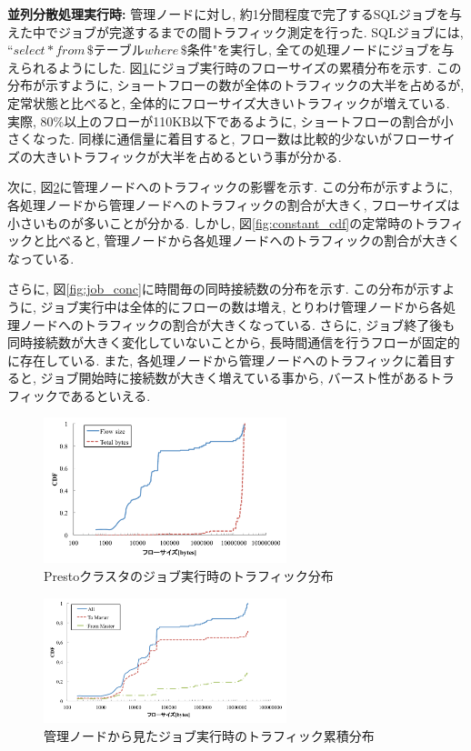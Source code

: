 {\bf 並列分散処理実行時: }
管理ノードに対し, 約1分間程度で完了するSQLジョブを与えた中でジョブが完遂するまでの間トラフィック測定を行った.
SQLジョブには, ``$select * from \, \$テーブル where \, \$条件$"を実行し,
全ての処理ノードにジョブを与えられるようにした.
図\ref{fig:job}にジョブ実行時のフローサイズの累積分布を示す.
この分布が示すように, ショートフローの数が全体のトラフィックの大半を占めるが, 定常状態と比べると,
全体的にフローサイズ大きいトラフィックが増えている.
実際, 80\%以上のフローが110KB以下であるように, ショートフローの割合が小さくなった.
同様に通信量に着目すると, フロー数は比較的少ないがフローサイズの大きいトラフィックが大半を占めるという事が分かる.

次に, 図\ref{fig:job_cdf}に管理ノードへのトラフィックの影響を示す.
この分布が示すように, 各処理ノードから管理ノードへのトラフィックの割合が大きく, フローサイズは小さいものが多いことが分かる.
しかし, 図\ref{fig:constant_cdf}の定常時のトラフィックと比べると,
管理ノードから各処理ノードへのトラフィックの割合が大きくなっている.

さらに, 図\ref{fig:job_conc}に時間毎の同時接続数の分布を示す.
この分布が示すように, ジョブ実行中は全体的にフローの数は増え, とりわけ管理ノードから各処理ノードへのトラフィックの割合が大きくなっている.
さらに, ジョブ終了後も同時接続数が大きく変化していないことから, 長時間通信を行うフローが固定的に存在している.
また, 各処理ノードから管理ノードへのトラフィックに着目すると, ジョブ開始時に接続数が大きく増えている事から, バースト性があるトラフィックであるといえる.

\begin{figure}[t]
    \begin{center}
    \includegraphics[autoebb, width=200pt]{./img/job.pdf}
    \caption{Prestoクラスタのジョブ実行時のトラフィック分布}
    \label{fig:job}
    \end{center}
\end{figure}

\begin{figure}[t]
    \begin{center}
    \includegraphics[autoebb, width=200pt]{./img/job_cdf.pdf}
    \caption{管理ノードから見たジョブ実行時のトラフィック累積分布}
    \label{fig:job_cdf}
    \end{center}
\end{figure}

